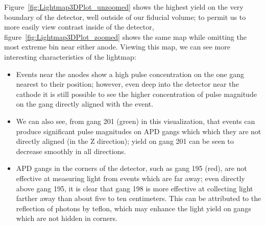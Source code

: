Figure~\ref{fig:Lightmap3DPlot_unzoomed} shows the highest yield on the very boundary of the detector, well outside of our fiducial volume; to permit us to more easily view contrast inside of the detector, figure~\ref{fig:Lightmap3DPlot_zoomed} shows the same map while omitting the most extreme bin near either anode.  Viewing this map, we can see more interesting characteristics of the lightmap:
\begin{itemize}
\item Events near the anodes show a high pulse concentration on the one gang nearest to their position; however, even deep into the detector near the cathode it is still possible to see the higher concentration of pulse magnitude on the gang directly aligned with the event.
\item We can also see, from gang 201 (green) in this visualization, that events can produce significant pulse magnitudes on APD gangs which which they are not directly aligned (in the Z direction); yield on gang 201 can be seen to decrease smoothly in all directions.
\item APD gangs in the corners of the detector, such as gang 195 (red), are not effective at measuring light from events which are far away; even directly above gang 195, it is clear that gang 198 is more effective at collecting light farther away than about five to ten centimeters.  This can be attributed to the reflection of photons by teflon, which may enhance the light yield on gangs which are not hidden in corners.
\end{itemize}

